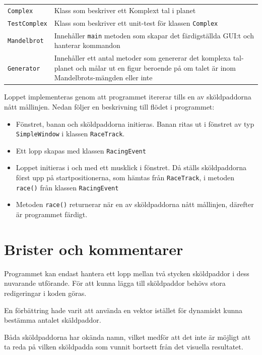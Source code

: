 \documentclass[a4paper]{article}
\newcommand{\code}[1]{\texttt{#1}} %
\begin{document}
\begin{tabular}{lp{8cm}}
\code{Complex} & Klass som beskriver ett Komplext tal i planet \\
\code{TestComplex} & Klass som beskriver ett unit-test för klassen \code{Complex} \\
\code{Mandelbrot} & Innehåller \code{main} metoden som skapar det färdigställda GUI:t och hanterar kommandon \\
\code{Generator} & Innehåller ett antal metoder som genererar det komplexa tal-planet och målar ut en figur beroende på om talet är inom Mandelbrots-mängden eller inte \\

\end{tabular}

\vspace{\baselineskip}
Loppet implementeras genom att programmet itererar tills en av sköldpaddorna nått mållinjen.
Nedan följer en beskrivning till flödet i programmet:

\begin{itemize}
\item Fönstret, banan och sköldpaddorna initieras. Banan ritas ut i fönstret av typ \code{SimpleWindow} i klassen \code{RaceTrack}.
\item Ett lopp skapas med klassen \code{RacingEvent}
\item Loppet initieras i och med ett musklick i fönstret. Då ställs sköldpaddorna först upp på startpositionerna, som hämtas från \code{RaceTrack},  i metoden \code{race()} från klassen \code{RacingEvent}
\item Metoden \code{race()} returnerar när en av sköldpaddorna nått mållinjen, därefter är programmet färdigt. 
\end{itemize}

\section{Brister och kommentarer}
Programmet kan endast hantera ett lopp mellan två stycken sköldpaddor i dess nuvarande utförande. För att kunna lägga till sköldpaddor behövs stora redigeringar i koden göras.

En förbättring hade varit att använda en vektor istället för dynamiskt kunna bestämma antalet skäldpaddor.

Båda sköldpaddorna har okända namn, vilket medför att det inte är möjligt att ta reda på vilken sköldpadda som vunnit bortsett från det visuella resultatet. 
\end{document}
